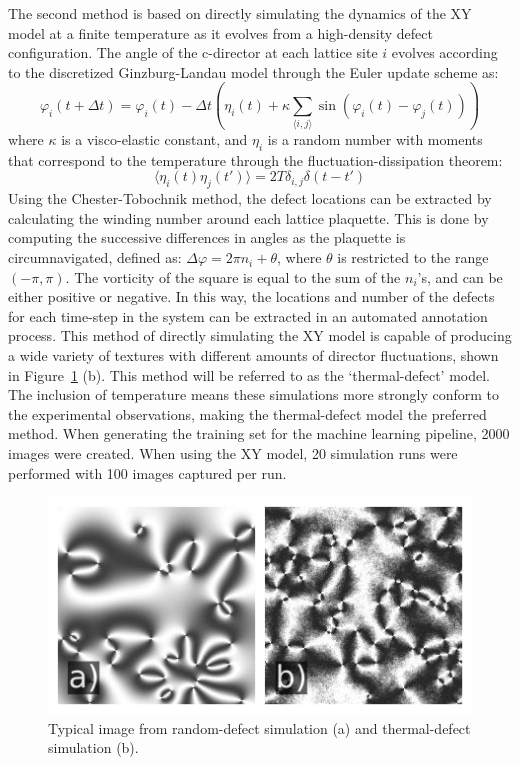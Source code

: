 \documentclass[twoside,twocolumn,9pt]{article}
\begin{document}
The second method is based on directly simulating the dynamics of the XY model at a finite temperature as it evolves from a high-density defect configuration\cite{loft_numerical_1987, yurke_coarsening_1993, jelic_quench_2011}. The angle of the c-director at each lattice site $i$ evolves according to the discretized Ginzburg-Landau model through the Euler update scheme as:
\begin{equation}
    \varphi_i(t+\Delta t) = \varphi_i(t) -\Delta t \left( \eta_i(t) + \kappa \sum_{\langle i,j \rangle} \sin(\varphi_i(t) - \varphi_j(t)) \right)
\end{equation}
where $\kappa$ is a visco-elastic constant, and $\eta_i$ is a random number with moments that correspond to the temperature through the fluctuation-dissipation theorem:
\begin{equation}
    \langle \eta_i(t) \eta_j(t') \rangle  = 2 T \delta_{i,j} \delta(t-t')
\end{equation}
Using the Chester-Tobochnik method\cite{tobochnik_monte_1979}, the defect locations can be extracted by calculating the winding number around each lattice plaquette. This is done by computing the successive differences in angles as the plaquette is circumnavigated, defined as: $\Delta \varphi = 2 \pi n_i+ \theta$, where $\theta$ is restricted to the range $(-\pi,\pi)$. The vorticity of the square is equal to the sum of the $n_i$'s, and can be either positive or negative. In this way, the locations and number of the defects for each time-step in the system can be extracted in an automated annotation process. This method of directly simulating the XY model is capable of producing a wide variety of textures with different amounts of director fluctuations, shown in Figure~\ref{fig:RandomDefect} (b). This method will be referred to as the `thermal-defect' model. The inclusion of temperature means these simulations more strongly conform to the experimental observations, making the thermal-defect model the preferred method.
When generating the training set for the machine learning pipeline, 2000 images were created. When using the XY model, 20 simulation runs were performed with 100 images captured per run. 


\begin{figure}
  \includegraphics[width=\linewidth]{simulations.png}
  \caption{Typical image from random-defect simulation (a) and thermal-defect simulation (b). }
  \label{fig:RandomDefect}
\end{figure}
\end{document}
